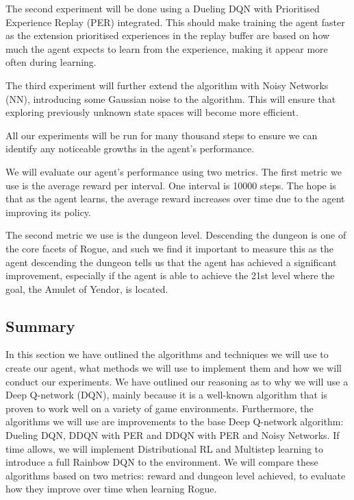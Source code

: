 \documentclass[12pt,a4paper]{article}
\begin{document}
    The second experiment will be done using a Dueling DQN with Prioritised Experience Replay (PER) integrated.
    This should make training the agent faster as the extension prioritised experiences in the replay
    buffer are based on how much the agent expects to learn from the experience, making it appear more often during learning.

    The third experiment will further extend the algorithm with Noisy Networks (NN), introducing some Gaussian noise to the
    algorithm.
    This will ensure that exploring previously unknown state spaces will become more efficient.

    All our experiments will be run for many thousand steps to ensure we can identify any noticeable growths
    in the agent's performance.

    We will evaluate our agent's performance using two metrics.
    The first metric we use is the average reward per interval.
    One interval is 10000 steps.
    The hope is that as the agent learns, the average reward increases over time due to the agent improving its policy.

    The second metric we use is the dungeon level.
    Descending the dungeon is one of the core facets of Rogue, and such we find it important to measure this as the agent descending the dungeon
    tells us that the agent has achieved a significant improvement, especially if the agent is able to achieve the 21st level where
    the goal, the Amulet of Yendor, is located.

    \subsection{Summary}\label{subsec:summary2}
    In this section we have outlined the algorithms and techniques we will use to create our agent, what methods we will use to implement them and how we will conduct our experiments.
    We have outlined our reasoning as to why we will use a Deep Q-network (DQN), mainly because it is a well-known algorithm that is proven to work well on a variety of game environments.
    Furthermore, the algorithms we will use are improvements to the base Deep Q-network algorithm: Dueling DQN, DDQN with PER and DDQN with PER and Noisy Networks.
    If time allows, we will implement Distributional RL and Multistep learning to introduce a full Rainbow DQN to the environment.
    We will compare these algorithms based on two metrics: reward and dungeon level achieved, to evaluate how they improve over time when learning Rogue.
\end{document}
